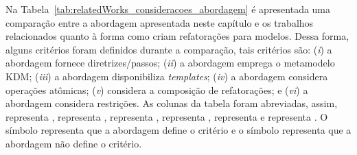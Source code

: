 Na Tabela~\ref{tab:relatedWorks_consideracoes_abordagem} é apresentada uma comparação entre a abordagem apresentada neste capítulo e os trabalhos relacionados quanto à forma como criam refatorações para modelos. Dessa forma, alguns critérios foram definidos durante a comparação, tais critérios são: (\textit{i}) a abordagem fornece diretrizes/passos; (\textit{ii}) a abordagem emprega o metamodelo KDM; (\textit{iii}) a abordagem disponibiliza \textit{templates}; (\textit{iv}) a abordagem considera operações atômicas; (\textit{v}) considera a composição de refatorações; e (\textit{vi}) a abordagem considera restrições. As colunas da tabela foram abreviadas, assim,  representa ,  representa ,  representa ,  representa ,  representa  e  representa . O símbolo  representa que a abordagem define o critério e o símbolo  representa que a abordagem não define o critério.


